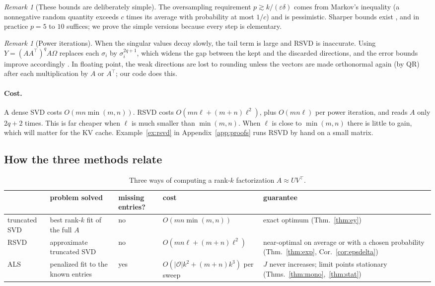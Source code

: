 \documentclass[10pt]{article}
\theoremstyle{plain}
\theoremstyle{definition}
\theoremstyle{remark}
\newtheorem{remark}[theorem]{Remark}
\newcommand{\T}{^{\top}}
\newcommand{\obs}{\mathcal{O}}
\begin{document}
\begin{remark}[These bounds are deliberately simple]\label{rem:crude}
The oversampling requirement $p\gtrsim k/(\varepsilon\delta)$ comes from Markov's inequality (a nonnegative random quantity exceeds $c$ times its average with probability at most $1/c$) and is pessimistic. Sharper bounds exist \cite{halko2011}, and in practice $p=5$ to $10$ suffices; we prove the simple versions because every step is elementary.
\end{remark}

\begin{remark}[Power iterations]\label{rem:power}
When the singular values decay slowly, the tail term is large and RSVD is inaccurate. Using $Y=(AA\T)^qA\Omega$ replaces each $\sigma_i$ by $\sigma_i^{2q+1}$, which widens the gap between the kept and the discarded directions, and the error bounds improve accordingly \cite[Sec.~10.4]{halko2011}. In floating point, the weak directions are lost to rounding unless the vectors are made orthonormal again (by QR) after each multiplication by $A$ or $A\T$; our code does this.
\end{remark}

\paragraph{Cost.}
A dense SVD costs $O(mn\min(m,n))$. RSVD costs $O(mn\ell+(m+n)\ell^2)$, plus $O(mn\ell)$ per power iteration, and reads $A$ only $2q+2$ times. This is far cheaper when $\ell$ is much smaller than $\min(m,n)$. When $\ell$ is close to $\min(m,n)$ there is little to gain, which will matter for the KV cache. Example~\ref{ex:rsvd} in Appendix~\ref{app:proofs} runs RSVD by hand on a small matrix.

\subsection{How the three methods relate}
\label{sec:unify}

\begin{table}[!tb]
\centering\small
\begin{tabularx}{\textwidth}{@{}>{\raggedright}p{2.0cm} >{\raggedright}X >{\raggedright}p{1.5cm} >{\raggedright}p{3.0cm} >{\raggedright\arraybackslash}X@{}}
\toprule
 & \textbf{problem solved} & \textbf{missing entries?} & \textbf{cost} & \textbf{guarantee}\\
\midrule
truncated SVD & best rank-$k$ fit of the full $A$ & no & $O(mn\min(m,n))$ & exact optimum (Thm.~\ref{thm:ey})\\
RSVD & approximate truncated SVD & no & $O(mn\ell+(m+n)\ell^2)$ & near-optimal on average or with a chosen probability (Thm.~\ref{thm:exp}, Cor.~\ref{cor:epsdelta})\\
ALS & penalized fit to the known entries & yes & $O(|\obs|k^2+(m+n)k^3)$ per sweep & $J$ never increases; limit points stationary (Thms.~\ref{thm:mono},~\ref{thm:stat})\\
\bottomrule
\end{tabularx}
\caption{Three ways of computing a rank-$k$ factorization $A\approx UV\T$.}
\label{tab:methods}
\end{table}
\end{document}
